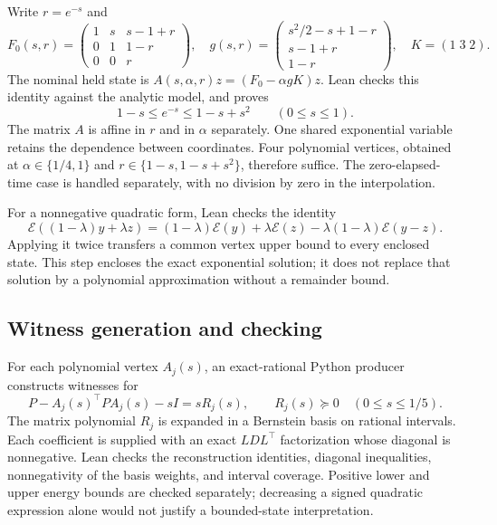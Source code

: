 \documentclass[10pt]{article}
\newcommand{\E}{\mathcal E}
\begin{document}
Write $r=e^{-s}$ and
\[
 F_0(s,r)=\begin{pmatrix}1&s&s-1+r\\0&1&1-r\\0&0&r\end{pmatrix},\quad
 g(s,r)=\begin{pmatrix}s^2/2-s+1-r\\s-1+r\\1-r\end{pmatrix},\quad K=(1\;3\;2).
\]
The nominal held state is $A(s,\alpha,r)z=(F_0-\alpha gK)z$. Lean checks this identity against the analytic model, and proves
\begin{equation}\label{eq:enclose}
 1-s\le e^{-s}\le1-s+s^2\qquad(0\le s\le1).
\end{equation}
The matrix $A$ is affine in $r$ and in $\alpha$ separately. One shared exponential variable retains the dependence between coordinates. Four polynomial vertices, obtained at $\alpha\in\{1/4,1\}$ and $r\in\{1-s,1-s+s^2\}$, therefore suffice. The zero-elapsed-time case is handled separately, with no division by zero in the interpolation.

For a nonnegative quadratic form, Lean checks the identity
\[
 \E((1-\lambda)y+\lambda z)
 =(1-\lambda)\E(y)+\lambda\E(z)-\lambda(1-\lambda)\E(y-z).
\]
Applying it twice transfers a common vertex upper bound to every enclosed state. This step encloses the exact exponential solution; it does not replace that solution by a polynomial approximation without a remainder bound.

\subsection{Witness generation and checking}
For each polynomial vertex $A_j(s)$, an exact-rational Python producer constructs witnesses for
\begin{equation}\label{eq:cert}
 P-A_j(s)^\top P A_j(s)-sI=sR_j(s),\qquad R_j(s)\succeq0\quad(0\le s\le1/5).
\end{equation}
The matrix polynomial $R_j$ is expanded in a Bernstein basis on rational intervals. Each coefficient is supplied with an exact $LDL^\top$ factorization whose diagonal is nonnegative. Lean checks the reconstruction identities, diagonal inequalities, nonnegativity of the basis weights, and interval coverage. Positive lower and upper energy bounds are checked separately; decreasing a signed quadratic expression alone would not justify a bounded-state interpretation.
\end{document}
